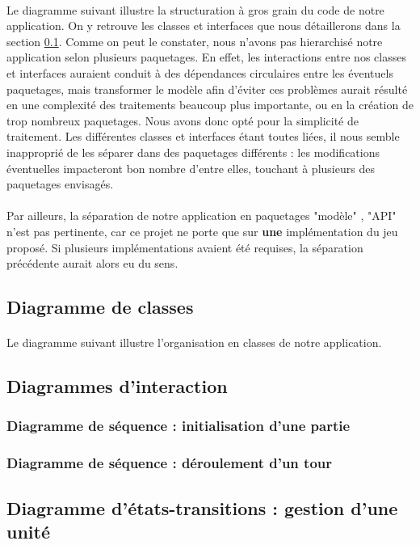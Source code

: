 \documentclass[a4paper]{article}
\begin{document}
\paragraph{}
Le diagramme suivant illustre la structuration à gros grain du code de notre application. On y retrouve les classes et interfaces que nous détaillerons dans la section \ref{DDC}.
Comme on peut le constater, nous n'avons pas hierarchisé notre application selon plusieurs paquetages. En effet, les interactions entre nos classes et interfaces auraient conduit à des dépendances circulaires entre les éventuels paquetages, mais transformer le modèle afin d'éviter ces problèmes aurait résulté en une complexité des traitements beaucoup plus importante, ou en la création de trop nombreux paquetages. Nous avons donc opté pour la simplicité de traitement. Les différentes classes et interfaces étant toutes liées, il nous semble inapproprié de les séparer dans des paquetages différents : les modifications éventuelles impacteront bon nombre d'entre elles, touchant à plusieurs des paquetages envisagés.

\paragraph{}
Par ailleurs, la séparation de notre application en paquetages "modèle" , "API" n'est pas pertinente, car ce projet ne porte que sur \textbf{une} implémentation du jeu proposé. Si plusieurs implémentations avaient été requises, la séparation précédente aurait alors eu du sens.



\subsection{Diagramme de classes}
\label{DDC}
\paragraph{}
Le diagramme suivant illustre l'organisation en classes de notre application.



\subsection{Diagrammes d'interaction}

\subsubsection{Diagramme de séquence : initialisation d'une partie}



\subsubsection{Diagramme de séquence : déroulement d'un tour}



\subsection{Diagramme d'états-transitions : gestion d'une unité}


\end{document}
